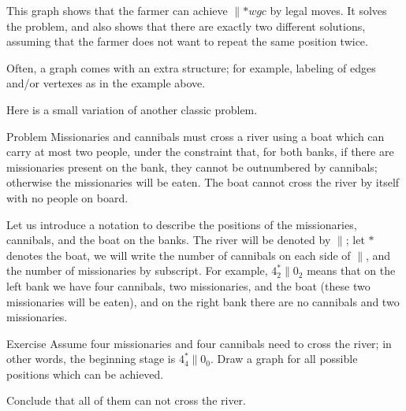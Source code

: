 \begin{center}
\end{center}

This graph shows that the farmer can achieve ${}{\parallel}{{*}wgc}$ by legal moves.
It solves the problem, and also shows that there are exactly two different solutions,
assuming that the farmer does not want to repeat the same position twice. 
\qeds

Often, a graph comes with an extra structure; for example, labeling of edges and/or vertexes as in the example above.

Here is a small variation of another classic problem.

\begin{thm}{Problem} Missionaries and cannibals must cross a river using a boat which can carry at most two people, under the constraint that, for both banks, if there are missionaries present on the bank, they cannot be outnumbered by cannibals; otherwise the missionaries will be eaten.
The boat cannot cross the river by itself with no people on board.
\end{thm}

Let us introduce a notation to describe the positions of the missionaries, cannibals, and the boat on the banks.
The river will be denoted by ${\parallel}$;
let $*$ denotes the boat, we will write the number of cannibals on each side of ${\parallel}$, and the number of missionaries by subscript. 
For example, $4_2^*{\parallel}0_2$ means that on the left bank we have four cannibals, two missionaries, and the boat (these two missionaries will be eaten), and on the right bank there are no cannibals and two missionaries.

\begin{thm}{Exercise}
Assume four missionaries and four cannibals need to cross the river; in other words, the beginning stage is $4_4^*{\parallel}0_0$.
Draw a graph for all possible positions which can be achieved.

Conclude that all of them can not cross the river.
\end{thm}
